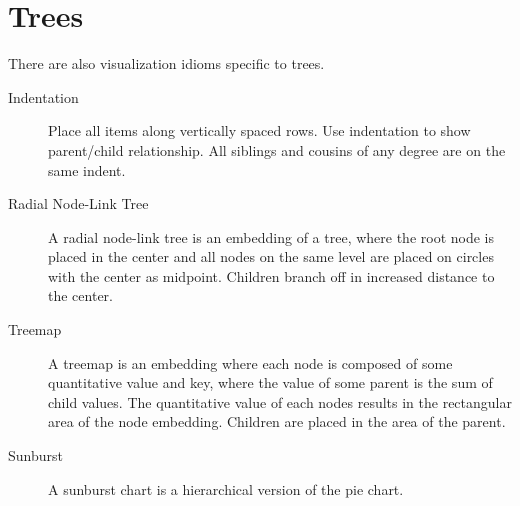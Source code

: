 \section{Trees}
There are also visualization idioms specific to trees.
\begin{description}
    \item[Indentation] Place all items along vertically spaced rows.
        Use indentation to show parent/child relationship.
        All siblings and cousins of any degree are on the same indent.

    \item[Radial Node-Link Tree] A radial node-link tree is an embedding of a tree, where the root node is placed in the center and all nodes on the same level are placed on circles with the center as midpoint.
        Children branch off in increased distance to the center.

    \item[Treemap] A treemap is an embedding where each node is composed of some quantitative value and key, where the value of some parent is the sum of child values.
        The quantitative value of each nodes results in the rectangular area of the node embedding.
        Children are placed in the area of the parent.

    \item[Sunburst] A sunburst chart is a hierarchical version of the pie chart.
\end{description}
